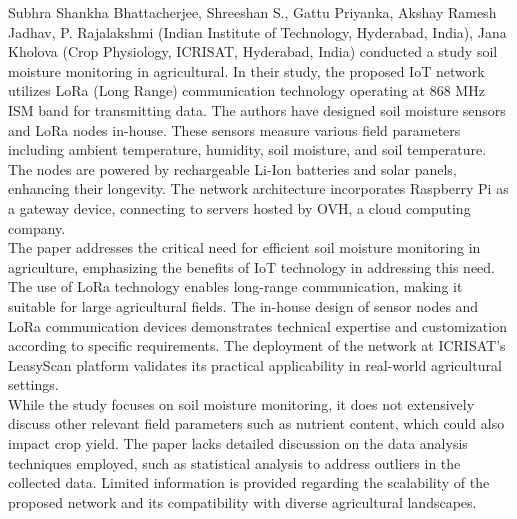 \documentclass[12pt, a4paper]{article}
\begin{document}
Subhra Shankha Bhattacherjee, Shreeshan S., Gattu Priyanka, Akshay Ramesh Jadhav, P. Rajalakshmi (Indian Institute of Technology, Hyderabad, India), Jana Kholova (Crop Physiology, ICRISAT, Hyderabad, India)\cite{bhattacherjee2020cloud} conducted a study soil moisture monitoring in agricultural.
In their study, the proposed IoT network utilizes LoRa (Long Range) communication technology operating
at 868 MHz ISM band for transmitting data. The authors have designed soil moisture sensors and LoRa nodes in-house. These sensors measure various field parameters including ambient temperature, humidity, soil moisture, and soil temperature. The nodes are powered by rechargeable Li-Ion batteries and solar panels, enhancing their longevity. The network architecture incorporates Raspberry Pi as a gateway device, connecting to servers hosted by OVH, a cloud computing company.\\
The paper addresses the critical need for efficient soil moisture monitoring in agriculture,
emphasizing the benefits of IoT technology in addressing this need. The use of LoRa technology enables long-range communication, making it suitable for large agricultural fields. The in-house design of sensor nodes and LoRa communication devices demonstrates technical expertise and customization according to specific requirements. The deployment of the network at ICRISAT's LeasyScan platform validates its practical applicability in real-world agricultural settings.\\
While the study focuses on soil moisture monitoring, it does not extensively discuss other relevant field parameters such as nutrient content, which could also impact crop yield. The paper lacks detailed discussion on the data analysis techniques employed, such as statistical analysis to address outliers in the collected data. Limited information is provided regarding the scalability of the proposed network and its compatibility with diverse agricultural landscapes.
\end{document}
